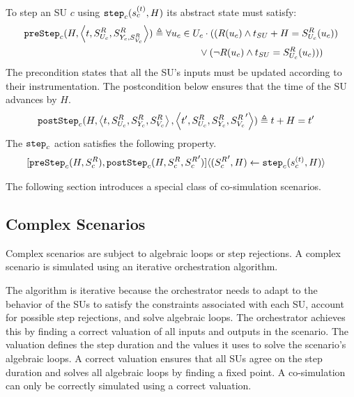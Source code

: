   \begin{definition}\label{def:step}
    To step an SU $c$ using $\mathtt{step}_{c}(s_{c}^{(t)}, H)$ its abstract state must satisfy:
    \begin{align*}
      &\mathtt{preStep}_{c}(H,  \left\langle t,S^{R}_{U_{c}}, S^{R}_{Y_{c}, S^{R}_{V_c}} \right\rangle ) \triangleq 
      \forall u_{c} \in U_{c}
      \cdot 
      ((R(u_{c}) \land t_{SU} + H = S^{R}_{U_{c}}(u_{c}))
      \nonumber \\
      &\qquad \qquad \qquad \qquad \qquad \qquad \qquad \qquad \qquad 
      \lor 
      (\neg R(u_{c}) \land t_{SU} = S^{R}_{U_{c}}(u_{c})))
    \end{align*}
    The precondition states that all the SU's inputs must be updated according to their instrumentation.  
    The postcondition below ensures that the time of the SU advances by $H$.
    \begin{align*}
      &\mathtt{postStep}_{c}(H,  \left\langle t,S^{R}_{U_{c}}, S^{R}_{Y_{c}}, S^{R}_{V_c} \right\rangle ,  \left\langle t',S^{R}_{U_{c}}, S^{R}_{Y_{c}}, {S^{R}_{V_c}}' \right\rangle ) \triangleq t + H = t'
    \end{align*}
    The $\mathtt{step}_{c}$ action satisfies the following property.
    \begin{align*}
      &[\mathtt{preStep}_{c}(H, S^{R}_{c}), 
      \mathtt{postStep}_{c}(H, S^{R}_{c}, {S^{R}_{c}}')] 
      \langle ({S^{R}_{c}}', H) \gets \mathtt{step}_{c}(s_{c}^{(t)},H) \rangle \nonumber
    \end{align*}
  \end{definition}

The following section introduces a special class of co-simulation scenarios.

\subsection{Complex Scenarios}
Complex scenarios are subject to algebraic loops or step rejections.
A complex scenario is simulated using an iterative orchestration algorithm.

The algorithm is iterative because the orchestrator needs to adapt to the behavior of the SUs to satisfy the constraints associated with each SU, account for possible step rejections, and solve algebraic loops. 
The orchestrator achieves this by finding a correct valuation of all inputs and outputs in the scenario.
The valuation defines the step duration and the values it uses to solve the scenario's algebraic loops. 
A correct valuation ensures that all SUs agree on the step duration and solves all algebraic loops by finding a fixed point.
A co-simulation can only be correctly simulated using a correct valuation.

